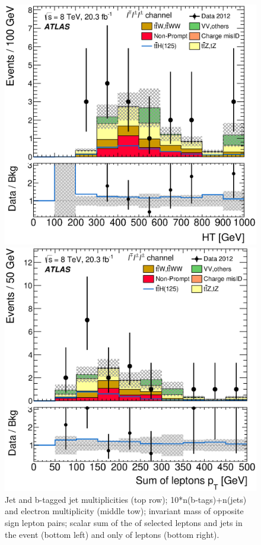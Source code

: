 \begin{figure}[!htbp]
\begin{minipage}[h]{0.4\textwidth}
  \end{minipage}\hfill
  \begin{minipage}[h]{0.4\textwidth}
    \centering \includegraphics[width=\textwidth]{figs/results/results_new/3lep_SR_HT}
  \end{minipage}\hfill
  \begin{minipage}[h]{0.4\textwidth}
    \centering \includegraphics[width=\textwidth]{figs/results/results_new/3lep_SR_SumPtLep}
  \end{minipage}\hfill
  \caption{Jet and b-tagged jet multiplicities (top row);
    10*n(b-tags)+n(jets) and electron multiplicity (middle tow);
    invariant mass of opposite sign lepton pairs; 
    scalar sum of the \pt of selected leptons and jets in the event (bottom left) and only of leptons (bottom right).
}
  \label{figure:results_3l_event}
\end{figure} 
